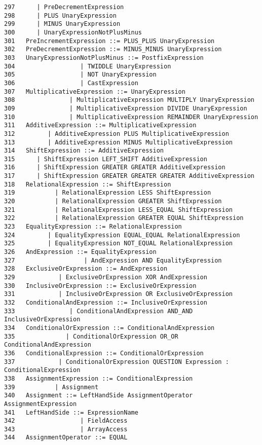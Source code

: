 {\begin{verbatim}
297      | PreDecrementExpression
298      | PLUS UnaryExpression
299      | MINUS UnaryExpression
300      | UnaryExpressionNotPlusMinus
301   PreIncrementExpression ::= PLUS_PLUS UnaryExpression
302   PreDecrementExpression ::= MINUS_MINUS UnaryExpression
303   UnaryExpressionNotPlusMinus ::= PostfixExpression
304                  | TWIDDLE UnaryExpression
305                  | NOT UnaryExpression
306                  | CastExpression
307   MultiplicativeExpression ::= UnaryExpression
308               | MultiplicativeExpression MULTIPLY UnaryExpression
309               | MultiplicativeExpression DIVIDE UnaryExpression
310               | MultiplicativeExpression REMAINDER UnaryExpression
311   AdditiveExpression ::= MultiplicativeExpression
312         | AdditiveExpression PLUS MultiplicativeExpression
313         | AdditiveExpression MINUS MultiplicativeExpression
314   ShiftExpression ::= AdditiveExpression
315      | ShiftExpression LEFT_SHIFT AdditiveExpression
316      | ShiftExpression GREATER GREATER AdditiveExpression
317      | ShiftExpression GREATER GREATER GREATER AdditiveExpression
318   RelationalExpression ::= ShiftExpression
319           | RelationalExpression LESS ShiftExpression
320           | RelationalExpression GREATER ShiftExpression
321           | RelationalExpression LESS_EQUAL ShiftExpression
322           | RelationalExpression GREATER EQUAL ShiftExpression
323   EqualityExpression ::= RelationalExpression
324         | EqualityExpression EQUAL_EQUAL RelationalExpression
325         | EqualityExpression NOT_EQUAL RelationalExpression
326   AndExpression ::= EqualityExpression
327                   | AndExpression AND EqualityExpression
328   ExclusiveOrExpression ::= AndExpression
329            | ExclusiveOrExpression XOR AndExpression
330   InclusiveOrExpression ::= ExclusiveOrExpression
331            | InclusiveOrExpression OR ExclusiveOrExpression
332   ConditionalAndExpression ::= InclusiveOrExpression
333               | ConditionalAndExpression AND_AND InclusiveOrExpression
334   ConditionalOrExpression ::= ConditionalAndExpression
335              | ConditionalOrExpression OR_OR ConditionalAndExpression
336   ConditionalExpression ::= ConditionalOrExpression
337            | ConditionalOrExpression QUESTION Expression : ConditionalExpression
338   AssignmentExpression ::= ConditionalExpression
339           | Assignment
340   Assignment ::= LeftHandSide AssignmentOperator AssignmentExpression
341   LeftHandSide ::= ExpressionName
342                  | FieldAccess
343                  | ArrayAccess
344   AssignmentOperator ::= EQUAL

\end{verbatim}}
